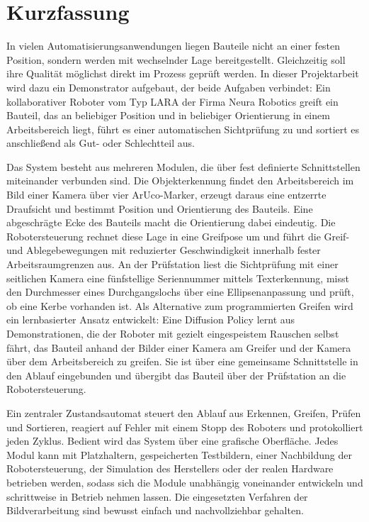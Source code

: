 \chapter*{Kurzfassung}

In vielen Automatisierungsanwendungen liegen Bauteile nicht an einer festen Position, sondern
werden mit wechselnder Lage bereitgestellt. Gleichzeitig soll ihre Qualität möglichst direkt im
Prozess geprüft werden. In dieser Projektarbeit wird dazu ein Demonstrator aufgebaut, der beide
Aufgaben verbindet: Ein kollaborativer Roboter vom Typ LARA der Firma Neura Robotics greift ein
Bauteil, das an beliebiger Position und in beliebiger Orientierung in einem Arbeitsbereich liegt,
führt es einer automatischen Sichtprüfung zu und sortiert es anschließend als Gut- oder
Schlechtteil aus.

Das System besteht aus mehreren Modulen, die über fest definierte Schnittstellen miteinander
verbunden sind. Die Objekterkennung findet den Arbeitsbereich im Bild einer Kamera über vier
ArUco-Marker, erzeugt daraus eine entzerrte Draufsicht und bestimmt Position und Orientierung
des Bauteils. Eine abgeschrägte Ecke des Bauteils macht die Orientierung dabei eindeutig. Die
Robotersteuerung rechnet diese Lage in eine Greifpose um und führt die Greif- und Ablegebewegungen
mit reduzierter Geschwindigkeit innerhalb fester Arbeitsraumgrenzen aus. An der Prüfstation
liest die Sichtprüfung mit einer seitlichen Kamera eine fünfstellige Seriennummer mittels
Texterkennung, misst den Durchmesser eines Durchgangslochs über eine Ellipsenanpassung und prüft,
ob eine Kerbe vorhanden ist. Als Alternative zum programmierten Greifen wird ein lernbasierter
Ansatz entwickelt: Eine Diffusion Policy lernt aus Demonstrationen, die der Roboter mit
gezielt eingespeistem Rauschen selbst fährt, das Bauteil anhand der Bilder einer Kamera am
Greifer und der Kamera über dem Arbeitsbereich zu greifen. Sie ist über eine gemeinsame
Schnittstelle in den Ablauf eingebunden und übergibt das Bauteil über der Prüfstation an die
Robotersteuerung.

Ein zentraler Zustandsautomat steuert den Ablauf aus Erkennen, Greifen, Prüfen und Sortieren,
reagiert auf Fehler mit einem Stopp des Roboters und protokolliert jeden Zyklus. Bedient wird
das System über eine grafische Oberfläche. Jedes Modul kann mit Platzhaltern, gespeicherten
Testbildern, einer Nachbildung der Robotersteuerung, der Simulation des Herstellers oder der
realen Hardware betrieben werden,
sodass sich die Module unabhängig voneinander entwickeln und schrittweise in Betrieb nehmen
lassen. Die eingesetzten Verfahren der Bildverarbeitung sind bewusst einfach und
nachvollziehbar gehalten.

